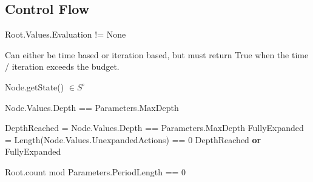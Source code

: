 \newpage
\subsection*{Control Flow}
\begin{algorithm}[H]
    \begin{algorithmic}[1]
            \State \Return Root.Values.Evaluation != None 
        \EndProcedure
    \end{algorithmic}    
\end{algorithm}

\begin{algorithm}[H]
    \begin{algorithmic}[1]
            \State \Comment Can either be time based or iteration based, but must return True when the time / iteration exceeds the budget. 
        \EndProcedure
    \end{algorithmic}    
\end{algorithm}

\begin{algorithm}[H]
    \begin{algorithmic}[1]
            \State \Return Node.getState() $\in S^\circ$  
        \EndProcedure
    \end{algorithmic}    
\end{algorithm}

\begin{algorithm}[H]
    \begin{algorithmic}[1]
            \State \Return Node.Values.Depth == Parameters.MaxDepth 
        \EndProcedure
    \end{algorithmic}    
\end{algorithm}

\begin{algorithm}[H]
    \begin{algorithmic}[1]
            \State DepthReached = Node.Values.Depth == Parameters.MaxDepth
            \State FullyExpanded = Length(Node.Values.UnexpandedActions) == 0
            \State \Return DepthReached \textbf{or} FullyExpanded
        \EndProcedure
    \end{algorithmic}    
\end{algorithm}

\begin{algorithm}[H]
    \begin{algorithmic}[1]
            \State \Return Root.count mod Parameters.PeriodLength == 0
        \EndProcedure
    \end{algorithmic}    
\end{algorithm}

